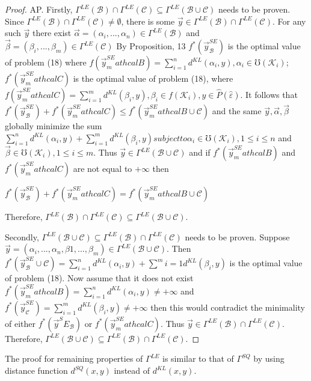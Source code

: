 \documentclass[]{iosart2c}
\begin{document}
\begin{proof}AP. Firstly, $\Gamma^{LE}(\mathcal{B}) \cap \Gamma^{LE}(\mathcal{C}) \subseteq \Gamma^{LE}(\mathcal{B} \cup \mathcal{C})$
needs to be proven. Since $\Gamma^{LE}(\mathcal{B}) \cap \Gamma^{LE}(\mathcal{C}) \neq \emptyset$,
there is some $\vec{y} \in \Gamma^{LE}(\mathcal{B}) \cap \Gamma^{LE}(\mathcal{C})$. For any
such $\vec{y}$ there exist $\vec{\alpha} = (\alpha_i, ... , \alpha_n) \in \Gamma^{LE}(\mathcal{B})$
and $\vec{\beta} = (\beta_i, ... , \beta_m) \in \Gamma^{LE}(\mathcal{C})$ By Proposition,
13 $f^*(\vec{y}^{SE}_\mathcal{B} )$ is the optimal value of problem
(18) where $f (\vec{y}^{SE}_mathcal{B} ) = \sum^n_{i=1} d^{KL}(\alpha_i, y), \alpha_i \in \mho(\mathcal{K}_i)$;
$f^*(\vec{y}^{SE}_mathcal{C} )$ is the optimal value of problem (18),
where $f (\vec{y}^{SE}_mathcal{C} ) = \sum^m_{i=1} d^{KL}(\beta_i, y), \beta_i \in f(\mathcal{K}_i), y \in	
\widehat{P}(\hat{\varepsilon})$. It follows that $f^*(\vec{y}^{SE}_\mathcal{B} ) + f^*(\vec{y}^{SE}_mathcal{C} ) \leq f^*(\vec{y}^{SE}_mathcal{B}\cup\mathcal{C})$
and the same $\vec{y}, \vec{\alpha}, \vec{\beta}$ globally minimize the sum $\sum^n_{i=1} d^{KL}(\alpha_i, y) +\sum^m_{i=1} d^{KL}(\beta_i, y) subject to \alpha_i \in
\mho(\mathcal{K}_i), 1 \leq i \leq n$ and $\vec{\beta} \in \mho(\mathcal{K}_i), 1 \leq i \leq m$. Thus
$\vec{y} \in \Gamma^{LE}(\mathcal{B} \cup \mathcal{C})$ and if $f^*(\vec{y}^{SE}_mathcal{B} )$ and $f^*(\vec{y}^{SE}_mathcal{C} )$ are not
equal to $+\infty$ then 

$f^*(\vec{y}^{SE}_\mathcal{B} ) + f^*(\vec{y}^{SE}_mathcal{C} ) = f^*(\vec{y}^{SE}_mathcal{B}\cup\mathcal{C})$

Therefore, $\Gamma^{LE}(\mathcal{B}) \cap \Gamma^{LE}(\mathcal{C}) \subseteq \Gamma^{LE}(\mathcal{B} \cup \mathcal{C})$. 

Secondly, $\Gamma^{LE}(\mathcal{B} \cup \mathcal{C}) \subseteq \Gamma^{LE}(\mathcal{B}) \cap \Gamma^{LE}(\mathcal{C})$ needs
to be proven. Suppose $\vec{y} = (\alpha_i, ... , \alpha_n, \beta1, ... , \beta_m)
\in \Gamma^{LE}(\mathcal{B} \cup \mathcal{C})$.
Then $f^*(\vec{y}^{SE}_\mathcal{B} \cup\mathcal{C}) = \sum^n_{i=1} d^{KL}(\alpha_i, y) + \sum^m{i=1} d^{KL}(\beta_i, y)$ is the optimal value of problem (18).
Now assume that it does not exist $f^*(\vec{y}^{SE}_mathcal{B} ) = \sum^n_{i=1} d^{KL}(\alpha_i, y) \neq +\infty$ and $f^*(\vec{y}^{SE}_\mathcal{C} ) = \sum^m_{i=1}
d^{KL}(\beta_i, y) \neq +\infty$ then this would contradict
the minimality of either $f^*(\vec{y}^SE_\mathcal{B})$ or
$f^*(\vec{y}^{SE}_mathcal{C} )$. Thus $\vec{y} \in \Gamma^{LE}(\mathcal{B}) \cap \Gamma^{LE}(\mathcal{C})$. Therefore,
$\Gamma^{LE}(\mathcal{B} \cup \mathcal{C}) \subseteq \Gamma^{LE}(\mathcal{B}) \cap \Gamma^{LE}(\mathcal{C})$.
\end{proof}
The proof for remaining properties of $\Gamma^{LE}$ is similar to that of
$\Gamma^{SQ}$ by using distance function $d^{SQ}(x, y)$
instead of $d^{KL}(x, y)$.
\end{document}
